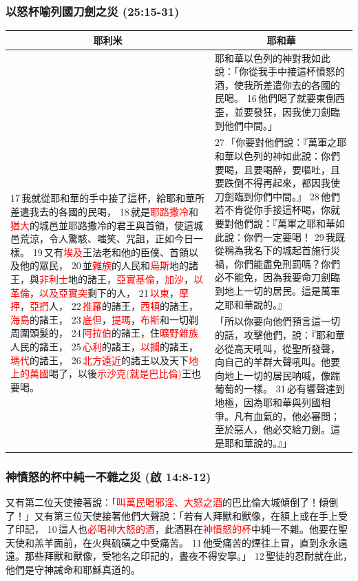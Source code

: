 \subsubsection{以怒杯喻列國刀劍之災 (25:15-31)}
\begin{table}[H]
\centering
\begin{tabular}{p{8.25cm}|p{9.25cm}}\hline\hline
\multicolumn{1}{c|}{耶利米}&\multicolumn{1}{c}{耶和華}\\\hline
&耶和華以色列的神對我如此說：「你從我手中接這杯憤怒的酒，使我所差遣你去的各國的民喝。 16 他們喝了就要東倒西歪，並要發狂，因我使刀劍臨到他們中間。」\\\hline
\multirow{2}{8.4cm}{17 我就從耶和華的手中接了這杯，給耶和華所差遣我去的各國的民喝， 18 就是\textcolor{red}{耶路撒冷}和\textcolor{red}{猶大}的城邑並耶路撒冷的君王與首領，使這城邑荒涼，令人驚駭、嗤笑、咒詛，正如今日一樣。 19 又有\textcolor{red}{埃及}王法老和他的臣僕、首領以及他的眾民， 20 並\textcolor{red}{雜族}的人民和\textcolor{red}{烏斯}地的諸王，與\textcolor{red}{非利士}地的諸王，\textcolor{red}{亞實基倫}，\textcolor{red}{加沙}，\textcolor{red}{以革倫}，\textcolor{red}{以及亞實突}剩下的人， 21 \textcolor{red}{以東}，\textcolor{red}{摩押}，\textcolor{red}{亞捫}人， 22 \textcolor{red}{推羅}的諸王，\textcolor{red}{西頓}的諸王，\textcolor{red}{海島}的諸王， 23\textcolor{red}{ 底但}，\textcolor{red}{提瑪}，\textcolor{red}{布斯}和一切剃周圍頭髮的， 24 \textcolor{red}{阿拉伯}的諸王，住\textcolor{red}{曠野雜族}人民的諸王， 25 \textcolor{red}{心利}的諸王，\textcolor{red}{以攔}的諸王，\textcolor{red}{瑪代}的諸王， 26 \textcolor{red}{北方遠近}的諸王以及天下\textcolor{red}{地上的萬國}喝了，以後\textcolor{red}{示沙克(就是巴比倫)}王也要喝。}
&27 「你要對他們說：『萬軍之耶和華以色列的神如此說：你們要喝，且要喝醉，要嘔吐，且要跌倒不得再起來，都因我使刀劍臨到你們中間。』 28 他們若不肯從你手接這杯喝，你就要對他們說：『萬軍之耶和華如此說：你們一定要喝！ 29 我既從稱為我名下的城起首施行災禍，你們能盡免刑罰嗎？你們必不能免，因為我要命刀劍臨到地上一切的居民。這是萬軍之耶和華說的。』\\\cline{2-2}
&「所以你要向他們預言這一切的話，攻擊他們，說：『耶和華必從高天吼叫，從聖所發聲，向自己的羊群大聲吼叫。他要向地上一切的居民呐喊，像踹葡萄的一樣。 31 必有響聲達到地極，因為耶和華與列國相爭。凡有血氣的，他必審問；至於惡人，他必交給刀劍。這是耶和華說的。』」\\\hline
\end{tabular}
\end{table}
 
\subsubsection{神憤怒的杯中純一不雜之災 (啟 14:8-12)}
又有第二位天使接著說：「\textcolor{red}{叫萬民喝邪淫、大怒之酒}的巴比倫大城傾倒了！傾倒了！」又有第三位天使接著他們大聲說：「若有人拜獸和獸像，在額上或在手上受了印記， 10 這人也\textcolor{red}{必喝神大怒的酒}，此酒斟在\textcolor{red}{神憤怒的杯}中純一不雜。他要在聖天使和羔羊面前，在火與硫磺之中受痛苦。 11 他受痛苦的煙往上冒，直到永永遠遠。那些拜獸和獸像，受牠名之印記的，晝夜不得安寧。」 12 聖徒的忍耐就在此，他們是守神誡命和耶穌真道的。


